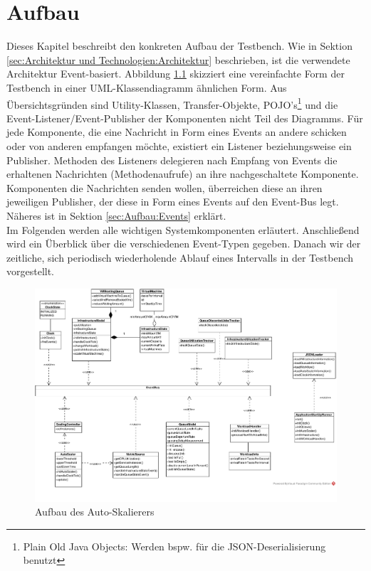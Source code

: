 \chapter{Aufbau}
\label{ch:Aufbau}
Dieses Kapitel beschreibt den konkreten Aufbau der Testbench. Wie in Sektion \ref{sec:Architektur und Technologien:Architektur} beschrieben, ist die verwendete Architektur Event-basiert. Abbildung \ref{fig:classDiagram} skizziert eine vereinfachte Form der Testbench in einer UML-Klassendiagramm ähnlichen Form. Aus Übersichtsgründen sind Utility-Klassen, Transfer-Objekte, POJO's\footnote{Plain Old Java Objects: Werden bspw. für die JSON-Deserialisierung benutzt} und die Event-Listener/Event-Publisher der Komponenten nicht Teil des Diagramms. Für jede Komponente, die eine Nachricht in Form eines Events an andere schicken oder von anderen empfangen möchte, existiert ein Listener beziehungsweise ein Publisher. Methoden des Listeners delegieren nach Empfang von Events die erhaltenen Nachrichten (Methodenaufrufe) an ihre nachgeschaltete Komponente. Komponenten die Nachrichten senden wollen, überreichen diese an ihren jeweiligen Publisher, der diese in Form eines Events auf den Event-Bus legt. Näheres ist in Sektion \ref{sec:Aufbau:Events} erklärt. \\
Im Folgenden werden alle wichtigen Systemkomponenten erläutert. Anschließend wird ein Überblick über die verschiedenen Event-Typen gegeben. Danach wir der zeitliche, sich periodisch wiederholende Ablauf eines Intervalls in der Testbench vorgestellt.







\begin{figure}[h]
	\centering
	\begin{sideways}
		\includegraphics[width=20.0cm, trim={0cm 0cm 0cm 0cm}]{img/classDiagram.pdf}
	\end{sideways}
		\caption{Aufbau des Auto-Skalierers}
	\label{fig:classDiagram}
\end{figure}


